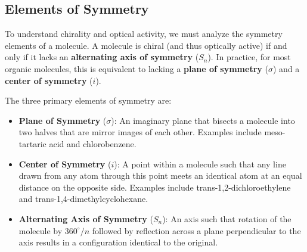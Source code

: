 \documentclass[12pt,a4paper]{article}
\begin{document}
\subsection{Elements of Symmetry}
To understand chirality and optical activity, we must analyze the symmetry elements of a molecule. A molecule is chiral (and thus optically active) if and only if it lacks an \textbf{alternating axis of symmetry} ($S_n$). In practice, for most organic molecules, this is equivalent to lacking a \textbf{plane of symmetry} ($\sigma$) and a \textbf{center of symmetry} ($i$).

\begin{tcolorbox}[defbox, title={Symmetry Elements}]
The three primary elements of symmetry are:
\begin{itemize}[leftmargin=*, itemsep=3pt, topsep=2pt]
  \item \textbf{Plane of Symmetry} ($\sigma$): An imaginary plane that bisects a molecule into two halves that are mirror images of each other. Examples include meso-tartaric acid and chlorobenzene.
  \item \textbf{Center of Symmetry} ($i$): A point within a molecule such that any line drawn from any atom through this point meets an identical atom at an equal distance on the opposite side. Examples include trans-1,2-dichloroethylene and trans-1,4-dimethylcyclohexane.
  \item \textbf{Alternating Axis of Symmetry} ($S_n$): An axis such that rotation of the molecule by $360^\circ/n$ followed by reflection across a plane perpendicular to the axis results in a configuration identical to the original.
\end{itemize}
\end{tcolorbox}
\end{document}
